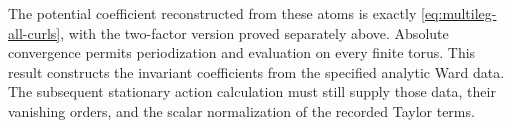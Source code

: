 The potential coefficient reconstructed from these atoms is
exactly \eqref{eq:multileg-all-curls}, with the two-factor version
proved separately above. Absolute convergence permits
periodization and evaluation on every finite torus. This result
constructs the invariant coefficients from the specified analytic
Ward data. The subsequent stationary action calculation must
still supply those data, their vanishing orders, and the scalar
normalization of the recorded Taylor terms.
